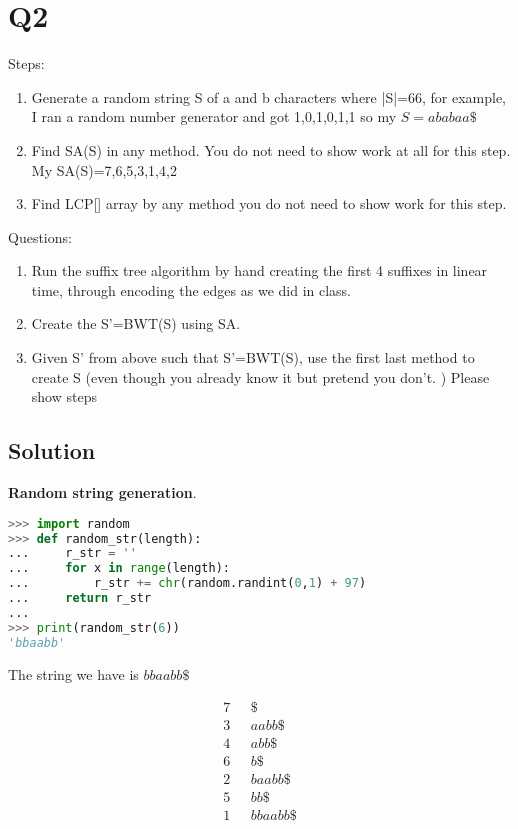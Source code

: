 

\section*{Q2}

Steps:
\begin{enumerate}
    \item Generate a random string S of a and b characters where |S|=66, for example, I ran a random number generator and got 1,0,1,0,1,1 so my $S=ababaa\$$
    \item Find SA(S) in any method. You do not need to show work at all for this step.
          My SA(S)=7,6,5,3,1,4,2

    \item Find LCP[] array by any method you do not need to show work for this step.
\end{enumerate}

Questions:
\begin{enumerate}
    \item Run the suffix tree algorithm by hand creating the first 4 suffixes in linear time, through encoding the edges as we did in class.
    \item Create the S'=BWT(S) using SA.
    \item Given S' from above such that S'=BWT(S), use the first last method to create S (even though you already know it but pretend you don't. ) Please show steps
\end{enumerate}




\subsection*{Solution}

\textbf{Random string generation}.
\begin{lstlisting}[language=python]
>>> import random
>>> def random_str(length):
...     r_str = ''
...     for x in range(length):
...         r_str += chr(random.randint(0,1) + 97)
...     return r_str
...
>>> print(random_str(6))
'bbaabb'
\end{lstlisting}

The string we have is $bbaabb\$$

\begin{align*}
    7\text{ } & \$       \\
    3\text{ } & aabb\$   \\
    4\text{ } & abb\$    \\
    6\text{ } & b\$      \\
    2\text{ } & baabb\$  \\
    5\text{ } & bb\$     \\
    1\text{ } & bbaabb\$ \\
\end{align*}


